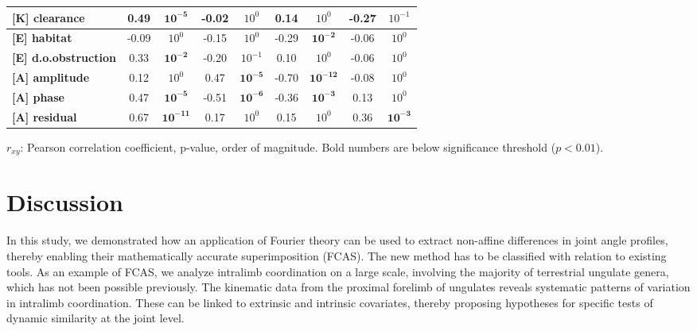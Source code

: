 \begin{table}[h]
\begin{tabular}{l @{$\quad$} cc @{$\quad$} cc @{$\quad$} cc @{$\quad$} cc}
\textbf{[K] clearance        } &                     0.49 &      $\mathbf{10^{-5}}$ &                    -0.02 &   $10^{0}$ &                     0.14 &   $10^{0}$ &                    -0.27 &  $10^{-1}$ \\
\midrule\textbf{[E] habitat          } &                    -0.09 &   $10^{0}$ &                    -0.15 &   $10^{0}$ &                    -0.29 &      $\mathbf{10^{-2}}$ &                    -0.06 &   $10^{0}$ \\
\textbf{[E] d.o.obstruction  } &                     0.33 &      $\mathbf{10^{-2}}$ &                    -0.20 &  $10^{-1}$ &                     0.10 &   $10^{0}$ &                    -0.06 &   $10^{0}$ \\
\midrule\textbf{[A] amplitude        } &                     0.12 &   $10^{0}$ &                     0.47 &      $\mathbf{10^{-5}}$ &                    -0.70 &     $\mathbf{10^{-12}}$ &                    -0.08 &   $10^{0}$ \\
\textbf{[A] phase            } &                     0.47 &      $\mathbf{10^{-5}}$ &                    -0.51 &      $\mathbf{10^{-6}}$ &                    -0.36 &      $\mathbf{10^{-3}}$ &                     0.13 &   $10^{0}$ \\
\textbf{[A] residual         } &                     0.67 &     $\mathbf{10^{-11}}$ &                     0.17 &   $10^{0}$ &                     0.15 &   $10^{0}$ &                     0.36 &      $\mathbf{10^{-3}}$ \\
\bottomrule
\end{tabular}\bigskip
\begin{flushleft}
$r_{xy}$: Pearson correlation coefficient,  p-value, order of magnitude. Bold numbers are below significance threshold ($p < 0.01$).
\end{flushleft}
\label{tab:correlations}
\end{table}




\FloatBarrier\clearpage
\section{Discussion}
In this study, we demonstrated how an application of Fourier theory can be used to extract non-affine differences in joint angle profiles, thereby enabling their mathematically accurate superimposition (FCAS).
The new method has to be classified with relation to existing tools.
As an example of FCAS, we analyze intralimb coordination on a large scale, involving the majority of terrestrial ungulate genera, which has not been possible previously.
The kinematic data from the proximal forelimb of ungulates reveals systematic patterns of variation in intralimb coordination.
These can be linked to extrinsic and intrinsic covariates, thereby proposing hypotheses for specific tests of dynamic similarity at the joint level.


